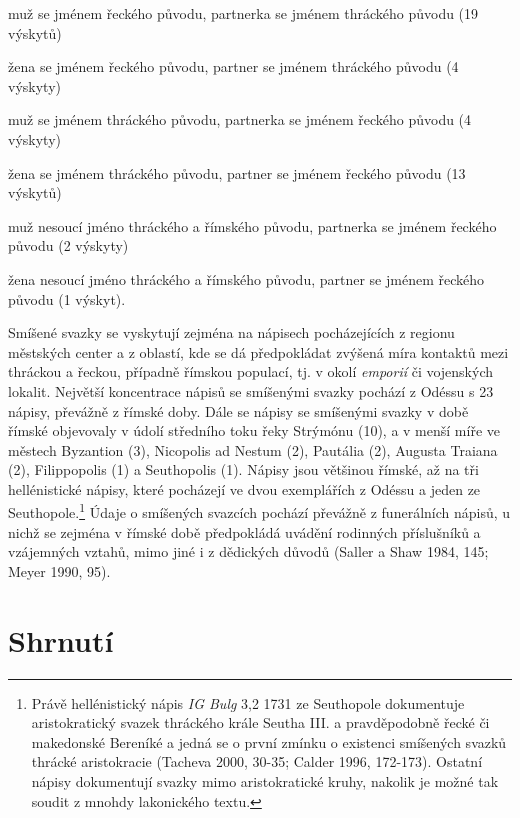 \startitemize[A][stopper=.]
\item
  \startblockquote
  muž se jménem řeckého původu, partnerka se jménem thráckého původu (19 výskytů)
  \stopblockquote
\item
  \startblockquote
  žena se jménem řeckého původu, partner se jménem thráckého původu (4 výskyty)
  \stopblockquote
\item
  \startblockquote
  muž se jménem thráckého původu, partnerka se jménem řeckého původu (4 výskyty)
  \stopblockquote
\item
  \startblockquote
  žena se jménem thráckého původu, partner se jménem řeckého původu (13 výskytů)
  \stopblockquote
\item
  \startblockquote
  muž nesoucí jméno thráckého a římského původu, partnerka se jménem řeckého původu (2 výskyty)
  \stopblockquote
\item
  \startblockquote
  žena nesoucí jméno thráckého a římského původu, partner se jménem řeckého původu (1 výskyt).
  \stopblockquote
\stopitemize

Smíšené svazky se vyskytují zejména na nápisech pocházejících z regionu městských center a z oblastí, kde se dá předpokládat zvýšená míra kontaktů mezi thráckou a řeckou, případně římskou populací, tj. v okolí {\em emporií} či vojenských lokalit. Největší koncentrace nápisů se smíšenými svazky pochází z Odéssu s 23 nápisy, převážně z římské doby. Dále se nápisy se smíšenými svazky v době římské objevovaly v údolí středního toku řeky Strýmónu (10), a v menší míře ve městech Byzantion (3), Nicopolis ad Nestum (2), Pautália (2), Augusta Traiana (2), Filippopolis (1) a Seuthopolis (1). Nápisy jsou většinou římské, až na tři hellénistické nápisy, které pocházejí ve dvou exemplářích z Odéssu a jeden ze Seuthopole.\footnote{Právě hellénistický nápis {\em IG Bulg} 3,2 1731 ze Seuthopole dokumentuje aristokratický svazek thráckého krále Seutha III. a pravděpodobně řecké či makedonské Bereníké a jedná se o první zmínku o existenci smíšených svazků thrácké aristokracie (Tacheva 2000, 30-35; Calder 1996, 172-173). Ostatní nápisy dokumentují svazky mimo aristokratické kruhy, nakolik je možné tak soudit z mnohdy lakonického textu.} Údaje o smíšených svazcích pochází převážně z funerálních nápisů, u nichž se zejména v římské době předpokládá uvádění rodinných příslušníků a vzájemných vztahů, mimo jiné i z dědických důvodů (Saller a Shaw 1984, 145; Meyer 1990, 95).

\section[shrnutí-2]{Shrnutí}

